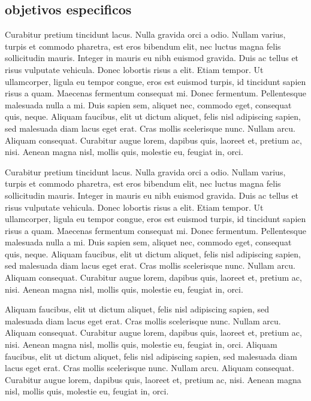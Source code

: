 \subsection{objetivos especificos}
Curabitur pretium tincidunt lacus. Nulla gravida orci a odio. Nullam varius, turpis et commodo pharetra, est eros bibendum elit, nec luctus magna felis sollicitudin mauris. Integer in mauris eu nibh euismod gravida. Duis ac tellus et risus vulputate vehicula. Donec lobortis risus a elit. Etiam tempor. Ut ullamcorper, ligula eu tempor congue, eros est euismod turpis, id tincidunt sapien risus a quam. Maecenas fermentum consequat mi. Donec fermentum. Pellentesque malesuada nulla a mi. Duis sapien sem, aliquet nec, commodo eget, consequat quis, neque. Aliquam faucibus, elit ut dictum aliquet, felis nisl adipiscing sapien, sed malesuada diam lacus eget erat. Cras mollis scelerisque nunc. Nullam arcu. Aliquam consequat. Curabitur augue lorem, dapibus quis, laoreet et, pretium ac, nisi. Aenean magna nisl, mollis quis, molestie eu, feugiat in, orci.

Curabitur pretium tincidunt lacus. Nulla gravida orci a odio. Nullam varius, turpis et commodo pharetra, est eros bibendum elit, nec luctus magna felis sollicitudin mauris. Integer in mauris eu nibh euismod gravida. Duis ac tellus et risus vulputate vehicula. Donec lobortis risus a elit. Etiam tempor. Ut ullamcorper, ligula eu tempor congue, eros est euismod turpis, id tincidunt sapien risus a quam. Maecenas fermentum consequat mi. Donec fermentum. Pellentesque malesuada nulla a mi. Duis sapien sem, aliquet nec, commodo eget, consequat quis, neque. Aliquam faucibus, elit ut dictum aliquet, felis nisl adipiscing sapien, sed malesuada diam lacus eget erat. Cras mollis scelerisque nunc. Nullam arcu. Aliquam consequat. Curabitur augue lorem, dapibus quis, laoreet et, pretium ac, nisi. Aenean magna nisl, mollis quis, molestie eu, feugiat in, orci.

 Aliquam faucibus, elit ut dictum aliquet, felis nisl adipiscing sapien, sed malesuada diam lacus eget erat. Cras mollis scelerisque nunc. Nullam arcu. Aliquam consequat. Curabitur augue lorem, dapibus quis, laoreet et, pretium ac, nisi. Aenean magna nisl, mollis quis, molestie eu, feugiat in, orci.  Aliquam faucibus, elit ut dictum aliquet, felis nisl adipiscing sapien, sed malesuada diam lacus eget erat. Cras mollis scelerisque nunc. Nullam arcu. Aliquam consequat. Curabitur augue lorem, dapibus quis, laoreet et, pretium ac, nisi. Aenean magna nisl, mollis quis, molestie eu, feugiat in, orci.